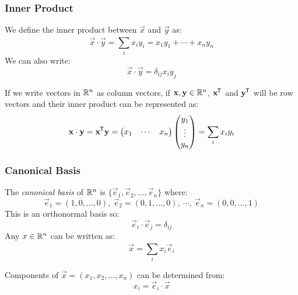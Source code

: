 \documentclass[../main.tex]{subfiles}
\begin{document}
\subsubsection{Inner Product}
We define the inner product between $\vec{x}$ and $\vec{y}$ as:
\[
  \vec{x} \cdot \vec{y} = \sum_{i}^{} x_i y_i = x_1 y_1 + \cdots + x_n y_n
\]
We can also write:
\[
  \vec{x} \cdot \vec{y} = \delta_{i j} x_i y_j
\]
\begin{remark}[Note]
  If we write vectors in $\mathbb{R}^{n}$ as column vectors, if $\boldsymbol{\mathbf{x}}, \boldsymbol{\mathbf{y}} \in \mathbb{R}^{n}$, $\boldsymbol{\mathbf{x}}^{{\mkern-1.5mu\mathsf{T}}}$ and $\boldsymbol{\mathbf{y}}^{{\mkern-1.5mu\mathsf{T}}}$ will be row vectors and their inner product can be represented as:
  \[
    \boldsymbol{\mathbf{x}} \cdot \boldsymbol{\mathbf{y}} = \boldsymbol{\mathbf{x}}^{{\mkern-1.5mu\mathsf{T}}} \boldsymbol{\mathbf{y}} =
    \begin{pmatrix}
    x_1 & \cdots & x_n \\
    \end{pmatrix}
    \begin{pmatrix}
    y_1 \\
    \vdots \\
    y_n \\
    \end{pmatrix}
    = \sum_{i}^{} x_i y_i
  \]
\end{remark}
\subsubsection{Canonical Basis}
The \textit{canonical basis} of $\mathbb{R}^{n}$ is $\{\vec{e}_1, \vec{e}_2, \ldots, \vec{e}_n\}$ where:
\[
  \vec{e}_1 = (1, 0, \ldots, 0),\ \vec{e}_2 = (0, 1, \ldots, 0),\ \cdots,\ \vec{e}_n = (0, 0, \ldots, 1)
\]
This is an orthonormal basis so:
\[
  \vec{e}_i \cdot \vec{e}_j = \delta_{i j}
\]
Any $x \in \mathbb{R}^{n}$ can be written as:
\[
  \vec{x} = \sum_{i}^{} x_i \vec{e}_i
\]

Components of $\vec{x} = (x_1, x_2, \ldots, x_n)$ can be determined from:
\[
  x_i = \vec{e}_i \cdot \vec{x}
\]
\end{document}
